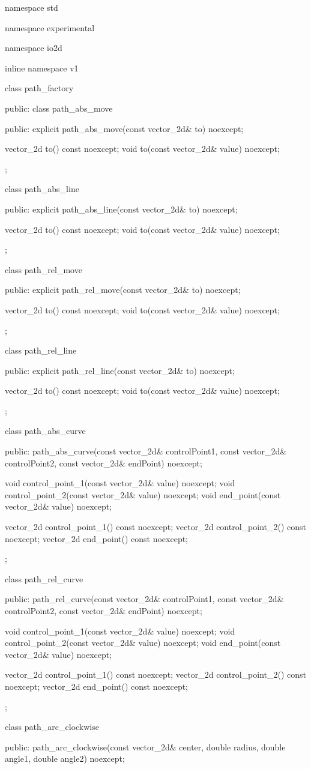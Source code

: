 \begin{codeblock}
namespace std { namespace experimental { namespace io2d { inline namespace v1 {
  class path_factory {
  public:
    class path_abs_move {
    public:
      explicit path_abs_move(const vector_2d& to) noexcept;
      
      vector_2d to() const noexcept;
      void to(const vector_2d& value) noexcept;
    };
    
    class path_abs_line {
    public:
      explicit path_abs_line(const vector_2d& to) noexcept;
      
      vector_2d to() const noexcept;
      void to(const vector_2d& value) noexcept;
    };
    
    class path_rel_move {
    public:
      explicit path_rel_move(const vector_2d& to) noexcept;
      
      vector_2d to() const noexcept;
      void to(const vector_2d& value) noexcept;
    };
    
    class path_rel_line {
    public:
      explicit path_rel_line(const vector_2d& to) noexcept;
      
      vector_2d to() const noexcept;
      void to(const vector_2d& value) noexcept;
    };
    
    class path_abs_curve {
    public:
      path_abs_curve(const vector_2d& controlPoint1, const vector_2d& controlPoint2, const vector_2d& endPoint) noexcept;
      
      void control_point_1(const vector_2d& value) noexcept;
      void control_point_2(const vector_2d& value) noexcept;
      void end_point(const vector_2d& value) noexcept;
      
      vector_2d control_point_1() const noexcept;
      vector_2d control_point_2() const noexcept;
      vector_2d end_point() const noexcept;
    };
    
    class path_rel_curve {
    public:
      path_rel_curve(const vector_2d& controlPoint1, const vector_2d& controlPoint2, const vector_2d& endPoint) noexcept;
      
      void control_point_1(const vector_2d& value) noexcept;
      void control_point_2(const vector_2d& value) noexcept;
      void end_point(const vector_2d& value) noexcept;
      
      vector_2d control_point_1() const noexcept;
      vector_2d control_point_2() const noexcept;
      vector_2d end_point() const noexcept;
    };
    
    class path_arc_clockwise {
    public:
      path_arc_clockwise(const vector_2d& center, double radius, double angle1, double angle2) noexcept;
      
}}}}}}
\end{codeblock}
